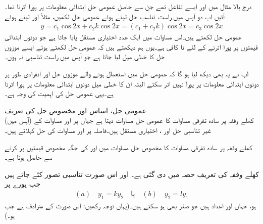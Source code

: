 درج بالا مثال میں  اور  ایسے تفاعل تھے جن سے حاصل عمومی حل ابتدائی معلومات پر پورا اترتا تھا۔آئیں اب دو آپس میں راست تناسب حل لیتے ہوئے عمومی حل  لکھیں، مثلاً  اور  لیتے ہوئے
\begin{align*}
y=c_1\cos 2x+c_2 k\cos 2x=(c_1+c_2k)\cos 2x=c_3\cos 2x
\end{align*}
عمومی حل لکھتے ہیں۔اس مساوات میں ایک عدد اختیاری مستقل  پایا جاتا ہے جو دونوں ابتدائی قیمتوں پر پورا اترنے کے لئے نا کافی ہے۔یوں ہم دیکھتے ہیں کہ عمومی حل لکھتے ہوئے ایسے موزوں حل کا خطی میل لیا جاتا ہے جو آپس میں راست تناسبی نہ ہوں۔

 آپ نے یہ بھی دیکھ لیا ہو گا کہ عمومی حل میں استعمال ہونے والے موزوں حل  اور  انفرادی طور پر دونوں ابتدائی معلومات پر پورا نہیں اتر سکتے البتہ ان کا خطی میل دونوں ابتدائی معلومات پر پورا اترتا ہے۔یہی عمومی حل کی اہمیت کی وجہ ہے۔

\quad عمومی حل، اساس اور مخصوص حل کی تعریف\\
کھلے وقفہ  پر سادہ تفرقی مساوات  کا عمومی حل مساوات  دیتا ہے جہاں  پر  اور  مساوات   کے  (آپس میں) غیر تناسبی حل اور ،  اختیاری مستقل ہیں۔فاصلہ  پر  اور  مساوات  کی  حل کہلاتے ہیں۔

کھلے وقفہ  پر سادہ تفرقی مساوات  کا مخصوص حل مساوات  میں  اور  کی جگہ مخصوص قیمتیں پر کرنے سے حاصل ہوتا ہے۔

کھلے وقفہ کی تعریف حصہ  میں دی گئی ہے۔  اور  اس صورت  تناسبی تصور کئے جاتے ہیں  جب پورے  پر
\begin{align}
(a)\quad y_1=ky_2 \quad \text{یا} \quad  (b) \quad y_2=ly_1
\end{align} 
ہو، جہاں  اور  اعداد ہیں جو صفر بھی ہو سکتے ہیں۔(یہاں توجہ رکھیں:  اس صورت  کے مترادف ہے جب  ہو۔)

